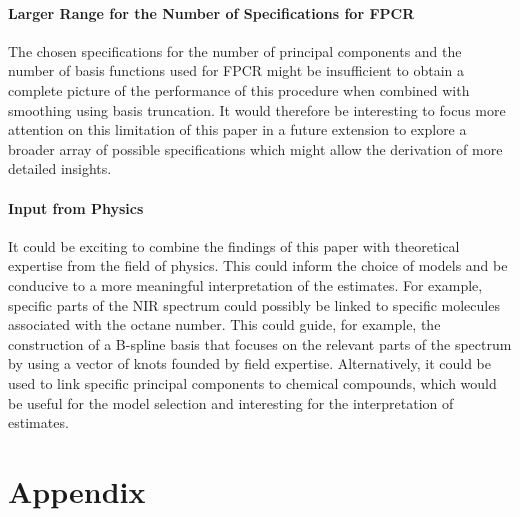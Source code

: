 \documentclass[11pt,twoside,a4paper]{article}
\begin{document}
	\paragraph{Larger Range for the Number of Specifications for FPCR}
	The chosen specifications for the number of principal components and the number of basis functions used for FPCR might be insufficient to obtain a complete picture of the performance of this procedure when combined with smoothing using basis truncation. It would therefore be interesting to focus more attention on this limitation of this paper in a future extension to explore a broader array of possible specifications which might allow the derivation of more detailed insights.
	\vspace{-0.2cm}
	
	\paragraph{Input from Physics}
	It could be exciting to combine the findings of this paper with theoretical expertise from the field of physics. This could inform the choice of models and be conducive to a more meaningful interpretation of the estimates. For example, specific parts of the NIR spectrum could possibly be linked to specific molecules associated with the octane number. This could guide, for example, the construction of a B-spline basis that focuses on the relevant parts of the spectrum by using a vector of knots founded by field expertise. Alternatively, it could be used to link specific principal components to chemical compounds, which would be useful for the model selection and interesting for the interpretation of estimates.
	\vspace{-0.2cm}
	
	\nocite{James.2009} %
	
	\newpage
	\section{Appendix}
	
\end{document}
